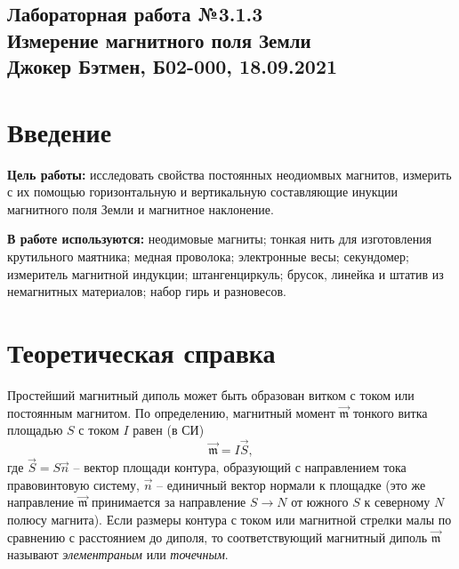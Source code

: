 \documentclass[a4paper,10pt]{article}
\begin{document}
  
\begin{center}
  \section*{Лабораторная работа №3.1.3 \\Измерение магнитного поля Земли\\Джокер Бэтмен, Б02-000, 18.09.2021}
\end{center}  

\vspace{5mm}
\section*{Введение}

\begin{flushleft}
  \textbf{Цель работы:} исследовать свойства постоянных неодиомвых магнитов, измерить с их помощью горизонтальную и вертикальную составляющие инукции магнитного поля Земли и магнитное наклонение.

\end{flushleft}

\begin{flushleft}
  \textbf{В работе используются:} неодимовые магниты; тонкая нить для изготовления крутильного маятника; медная проволока; электронные весы; секундомер; измеритель магнитной индукции; штангенциркуль; брусок, линейка и штатив из немагнитных материалов; набор гирь и разновесов.

\end{flushleft}

\section*{Теоретическая справка}

Простейший магнитный диполь может быть образован витком с током или постоянным магнитом. По определению, магнитный момент $\vec{\mathfrak{m}}$ тонкого витка площадью $S$ с током $I$ равен (в СИ)\[\vec{\mathfrak{m}}=I\vec{S},\]где $\vec{S}=S\vec{n}$ -- вектор площади контура, образующий с направлением тока правовинтовую систему, $\vec{n}$ -- единичный вектор нормали к площадке (это же направление $\vec{\mathfrak{m}}$ принимается за направление $S\to N$ от южного $S$ к северному $N$ полюсу магнита). Если размеры контура с током или магнитной стрелки малы по сравнению с расстоянием до диполя, то соответствующий магнитный диполь $\vec{\mathfrak{m}}$ называют \textit{элементраным} или \textit{точечным}.
\end{document}
